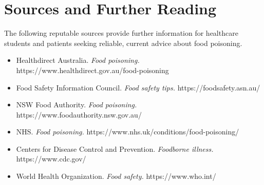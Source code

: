 \section*{Sources and Further Reading}
The following reputable sources provide further information for healthcare students and patients seeking reliable, current advice about food poisoning.
\begin{itemize}
    \item Healthdirect Australia. \textit{Food poisoning.} https://www.healthdirect.gov.au/food-poisoning
    \item Food Safety Information Council. \textit{Food safety tips.} https://foodsafety.asn.au/
    \item NSW Food Authority. \textit{Food poisoning.} https://www.foodauthority.nsw.gov.au/
    \item NHS. \textit{Food poisoning.} https://www.nhs.uk/conditions/food-poisoning/
    \item Centers for Disease Control and Prevention. \textit{Foodborne illness.} https://www.cdc.gov/
    \item World Health Organization. \textit{Food safety.} https://www.who.int/
\end{itemize}
